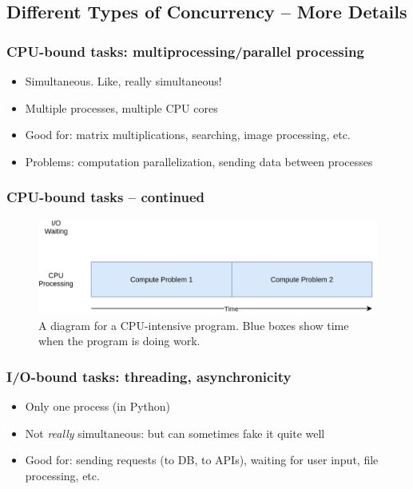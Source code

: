 \documentclass{beamer}
\begin{document}
    \subsection{Different Types of Concurrency -- More Details}

    \begin{frame}
        \frametitle{CPU-bound tasks: multiprocessing/parallel processing}

        \begin{itemize}
            \item Simultaneous. Like, really simultaneous!
            \item Multiple processes, multiple CPU cores
            \item Good for: matrix multiplications, searching, image processing, etc.
            \item Problems: computation parallelization, sending data between processes
        \end{itemize}

    \end{frame}

    \begin{frame}
        \frametitle{CPU-bound tasks -- continued}

        \begin{figure}
            \includegraphics[width=\linewidth]{../figures/CPUBound.png}
            \caption{A diagram for a CPU-intensive program. Blue boxes show time when the program is doing work.}
        \end{figure}

    \end{frame}

    \begin{frame}
        \frametitle{I/O-bound tasks: threading, asynchronicity}

        \begin{itemize}
            \item Only one process (in Python)
            \item Not \emph{really} simultaneous: but can sometimes fake it quite well
            \item Good for: sending requests (to DB, to APIs), waiting for user input, file processing, etc.
        \end{itemize}

    \end{frame}
\end{document}
